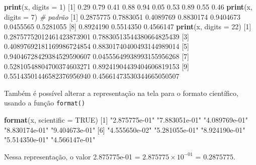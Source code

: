 \documentclass[10pt,a4paper]{book}
\newenvironment{Shaded}{\begin{snugshade}}{\end{snugshade}}
\newcommand{\KeywordTok}[1]{\textcolor[rgb]{0.13,0.29,0.53}{\textbf{#1}}}
\newcommand{\DataTypeTok}[1]{\textcolor[rgb]{0.13,0.29,0.53}{#1}}
\newcommand{\DecValTok}[1]{\textcolor[rgb]{0.00,0.00,0.81}{#1}}
\newcommand{\FloatTok}[1]{\textcolor[rgb]{0.00,0.00,0.81}{#1}}
\newcommand{\StringTok}[1]{\textcolor[rgb]{0.31,0.60,0.02}{#1}}
\newcommand{\CommentTok}[1]{\textcolor[rgb]{0.56,0.35,0.01}{\textit{#1}}}
\newcommand{\OtherTok}[1]{\textcolor[rgb]{0.56,0.35,0.01}{#1}}
\newcommand{\NormalTok}[1]{#1}
\begin{document}
\begin{Shaded}
\begin{Highlighting}[]
\KeywordTok{print}\NormalTok{(x, }\DataTypeTok{digits =} \DecValTok{1}\NormalTok{)}
\NormalTok{ [}\DecValTok{1}\NormalTok{] }\FloatTok{0.29} \FloatTok{0.79} \FloatTok{0.41} \FloatTok{0.88} \FloatTok{0.94} \FloatTok{0.05} \FloatTok{0.53} \FloatTok{0.89} \FloatTok{0.55} \FloatTok{0.46}
\KeywordTok{print}\NormalTok{(x, }\DataTypeTok{digits =} \DecValTok{7}\NormalTok{) }\CommentTok{# padrão}
\NormalTok{ [}\DecValTok{1}\NormalTok{] }\FloatTok{0.2875775} \FloatTok{0.7883051} \FloatTok{0.4089769} \FloatTok{0.8830174} \FloatTok{0.9404673} \FloatTok{0.0455565} \FloatTok{0.5281055}
\NormalTok{ [}\DecValTok{8}\NormalTok{] }\FloatTok{0.8924190} \FloatTok{0.5514350} \FloatTok{0.4566147}
\KeywordTok{print}\NormalTok{(x, }\DataTypeTok{digits =} \DecValTok{22}\NormalTok{)}
\NormalTok{ [}\DecValTok{1}\NormalTok{] }\FloatTok{0.28757752012461423873901} \FloatTok{0.78830513544380664825439}
\NormalTok{ [}\DecValTok{3}\NormalTok{] }\FloatTok{0.40897692181169986724854} \FloatTok{0.88301740400493144989014}
\NormalTok{ [}\DecValTok{5}\NormalTok{] }\FloatTok{0.94046728429384529590607} \FloatTok{0.04555649938993155956268}
\NormalTok{ [}\DecValTok{7}\NormalTok{] }\FloatTok{0.52810548804700374603271} \FloatTok{0.89241904439404606819153}
\NormalTok{ [}\DecValTok{9}\NormalTok{] }\FloatTok{0.55143501446582376956940} \FloatTok{0.45661473530344665050507}
\end{Highlighting}
\end{Shaded}

Também é possível alterar a representação na tela para o formato
científico, usando a função \texttt{format()}

\begin{Shaded}
\begin{Highlighting}[]
\KeywordTok{format}\NormalTok{(x, }\DataTypeTok{scientific =} \OtherTok{TRUE}\NormalTok{)}
\NormalTok{ [}\DecValTok{1}\NormalTok{] }\StringTok{"2.875775e-01"} \StringTok{"7.883051e-01"} \StringTok{"4.089769e-01"} \StringTok{"8.830174e-01"} \StringTok{"9.404673e-01"}
\NormalTok{ [}\DecValTok{6}\NormalTok{] }\StringTok{"4.555650e-02"} \StringTok{"5.281055e-01"} \StringTok{"8.924190e-01"} \StringTok{"5.514350e-01"} \StringTok{"4.566147e-01"}
\end{Highlighting}
\end{Shaded}

Nessa representação, o valor 2.875775e-01 = \(2.875775 \times 10^{-01}\)
= \(0.2875775\).
\end{document}
